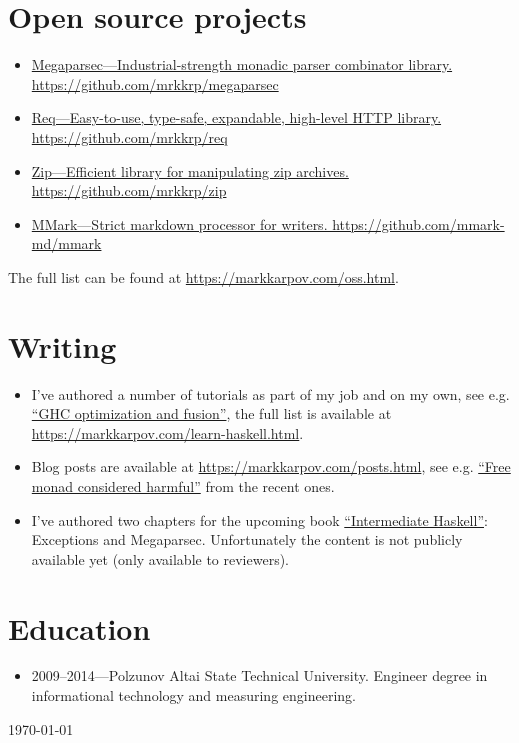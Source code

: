 \documentclass[a4paper,12pt]{article}
\begin{document}
\section*{Open source projects}

\begin{itemize}[noitemsep]
\item \href{https://github.com/mrkkrp/megaparsec}
  {Megaparsec---Industrial-strength monadic parser combinator library.
    \newline
    https://github.com/mrkkrp/megaparsec}
\item \href{https://github.com/mrkkrp/req}
  {Req---Easy-to-use, type-safe, expandable, high-level HTTP library.
    \newline
    https://github.com/mrkkrp/req}
\item \href{https://github.com/mrkkrp/zip}
  {Zip---Efficient library for manipulating zip archives.
    \newline
    https://github.com/mrkkrp/zip}
\item \href{https://github.com/mmark-md/mmark}
  {MMark---Strict markdown processor for writers.
    \newline
    https://github.com/mmark-md/mmark}
\end{itemize}

The full list can be found at \href{https://markkarpov.com/oss.html}{https://markkarpov.com/oss.html}.

\section*{Writing}

\begin{itemize}[noitemsep]
\item I've authored a number of tutorials as part of my job and on my own,
  see e.g.
  \href{https://www.stackbuilders.com/tutorials/haskell/ghc-optimization-and-fusion/}{“GHC
    optimization and fusion”}, the full list is available at \\
  \href{https://markkarpov.com/learn-haskell.html}{https://markkarpov.com/learn-haskell.html}.
\item Blog posts are available at
  \href{https://markkarpov.com/posts.html}{https://markkarpov.com/posts.html},
  see e.g.
  \href{https://markkarpov.com/post/free-monad-considered-harmful.html}{“Free
    monad considered harmful”} from the recent ones.
\item I've authored two chapters for the upcoming book
  \href{https://intermediatehaskell.com/}{“Intermediate Haskell”}:
  Exceptions and Megaparsec. Unfortunately the content is not publicly
  available yet (only available to reviewers).
\end{itemize}

\section*{Education}

\begin{itemize}[noitemsep]
\item 2009--2014---Polzunov Altai State Technical University. Engineer
  degree in informational technology and measuring engineering.
\end{itemize}

\begin{flushright}
  \today
\end{flushright}
\end{document}
